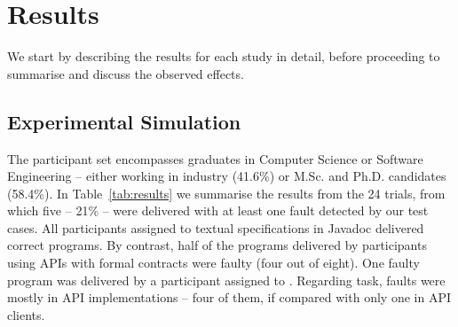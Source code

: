 \section{Results}
\label{sec:results}

We start by describing the results for each study in detail, before proceeding to summarise and discuss the observed effects.

\subsection{Experimental Simulation}
\label{sec:expResults}

The participant set encompasses graduates in Computer Science or Software Engineering -- either working in industry (41.6\%) or M.Sc. and Ph.D. candidates (58.4\%).
In Table~\ref{tab:results} we summarise the results from the 24 trials, from which five -- 21\% -- were delivered with at least one fault detected by our test cases.
All participants assigned to textual specifications in Javadoc delivered correct programs.
By contrast, half of the programs delivered by participants using APIs with formal contracts were faulty (four out of eight).
One faulty program was delivered by a participant assigned to \contractjdoc{}.
Regarding task, faults were mostly in API implementations -- four of them, if compared with only one in API clients.



